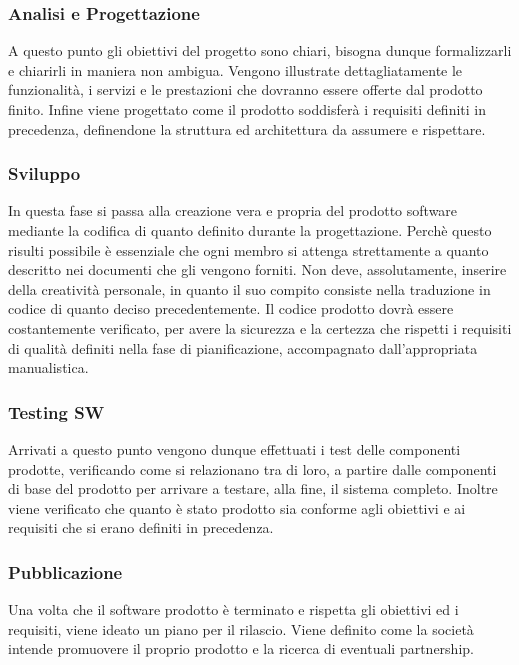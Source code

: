  \subsubsection{Analisi e Progettazione}

A questo punto gli obiettivi del progetto sono chiari, bisogna dunque formalizzarli e chiarirli in maniera non ambigua. 
Vengono illustrate dettagliatamente le funzionalità, i servizi e le prestazioni che dovranno essere offerte dal prodotto finito. 
Infine viene progettato come il prodotto soddisferà i requisiti definiti in precedenza, definendone la struttura ed architettura da assumere e rispettare.

 \subsubsection{Sviluppo }

In questa fase si passa alla creazione vera e propria del prodotto software mediante la codifica di quanto definito durante la progettazione. Perchè questo risulti possibile è essenziale che ogni membro si attenga strettamente a quanto descritto nei documenti che gli vengono forniti. Non deve, assolutamente, inserire della creatività personale, in quanto il suo compito consiste nella traduzione in codice di quanto deciso precedentemente.
Il codice prodotto dovrà essere costantemente verificato, per avere la sicurezza e la certezza che rispetti i requisiti di qualità definiti nella fase di pianificazione, accompagnato dall’appropriata manualistica.

 \subsubsection{Testing SW} 

Arrivati a questo punto vengono dunque effettuati i test delle componenti prodotte, verificando come si relazionano tra di loro, a partire dalle componenti di base del prodotto per arrivare a testare, alla fine, il
sistema completo.
Inoltre viene verificato che quanto è stato prodotto sia conforme agli obiettivi e ai requisiti che si erano definiti in precedenza.

 \subsubsection{Pubblicazione} 

Una volta che il software prodotto è terminato e rispetta gli obiettivi ed i requisiti, viene ideato un piano per il rilascio. Viene definito come la società intende promuovere il proprio prodotto e la ricerca di
eventuali partnership.


